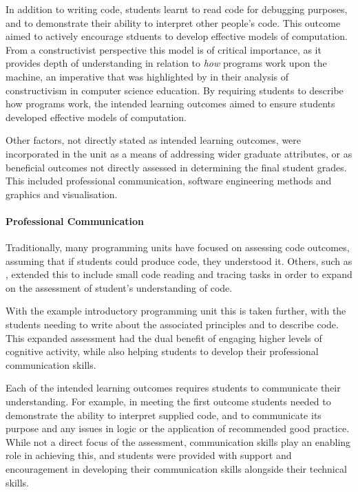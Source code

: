In addition to writing code, students learnt to read code for debugging purposes, and to demonstrate their ability to interpret other people's code. This outcome aimed to actively encourage stduents to develop effective models of computation. From a constructivist perspective this model is of critical importance, as it provides depth of understanding in relation to \emph{how} programs work upon the machine, an imperative that was highlighted by \citet{BenAri:1998,BenAri:2001} in their analysis of constructivism in computer science education. By requiring students to describe how programs work, the intended learning outcomes aimed to ensure students developed effective models of computation.

Other factors, not directly stated as intended learning outcomes, were incorporated in the unit as a means of addressing wider graduate attributes, or as beneficial outcomes not directly assessed in determining the final student grades. This included professional communication, software engineering methods and graphics and visualisation.

\paragraph{Professional Communication} %
\label{par:professional_communication}

Traditionally, many programming units have focused on assessing code outcomes, assuming that if students could produce code, they understood it. Others, such as \citet{Lister:2004}, extended this to include small code reading and tracing tasks in order to expand on the assessment of student's understanding of code. 

With the example introductory programming unit this is taken further, with the students needing to write about the associated principles and to describe code. This expanded assessment had the dual benefit of engaging higher levels of cognitive activity, while also helping students to develop their professional communication skills.

Each of the intended learning outcomes requires students to communicate their understanding. For example, in meeting the first outcome students needed to demonstrate the ability to interpret supplied code, and to communicate its purpose and any issues in logic or the application of recommended good practice. While not a direct focus of the assessment, communication skills play an enabling role in achieving this, and students were provided with support and encouragement in developing their communication skills alongside their technical skills.

